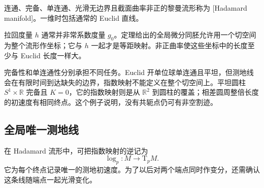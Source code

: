 \begin{definition}\label{g3:def:hadamard-manifold}
	连通、完备、单连通、光滑无边界且截面曲率非正的黎曼流形称为 [Hadamard manifold]。一维时包括通常的 Euclid 直线。
\end{definition}

拉回度量 \(h\) 通常并非常系数度量 \(g_0\)。定理给出的全局微分同胚允许用一个切空间为整个流形作坐标；它与 \(h\) 一起才是等距映射。非正曲率使这些坐标中的长度至少与 Euclid 长度一样大。

\begin{example}\label{g3:exm:hadamard-hypotheses}
	完备性和单连通性分别承担不同任务。Euclid 开单位球单连通且平坦，但测地线会在有限时间到达缺失的边界，指数映射不能定义在整个切空间上。平坦圆柱 \(S^1\times\mathbb R\) 完备且 \(K=0\)，它的指数映射则是从 \(\mathbb R^2\) 到圆柱的覆盖；相差圆周整倍长度的初速度有相同终点。这个例子说明，没有共轭点仍可有非空割迹。
\end{example}

\subsection{全局唯一测地线}
\label{g3:subsec:0901:03}

在 Hadamard 流形中，可把指数映射的逆记为
\[
	\log_p:M\longrightarrow\mathrm{T}_pM.
\]
它为每个终点记录唯一的测地初速度。为了以后对两个端点同时作变分，还需确认这条线随端点一起光滑变化。

